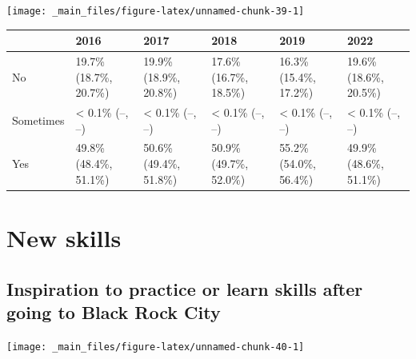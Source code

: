 \documentclass[
]{book}
\begin{document}
\texttt{[image: \_main\_files/figure-latex/unnamed-chunk-39-1]}

\begin{table}
\centering
\begin{tabular}[t]{>{}l|>{}l|>{}l|>{}l|>{}l|>{}l}
\hline
  & 2016 & 2017 & 2018 & 2019 & 2022\\
\hline
No & 19.7\% (18.7\%, 20.7\%) & 19.9\% (18.9\%, 20.8\%) & 17.6\% (16.7\%, 18.5\%) & 16.3\% (15.4\%, 17.2\%) & 19.6\% (18.6\%, 20.5\%)\\
\hline
Sometimes & < 0.1\% (--, --) & < 0.1\% (--, --) & < 0.1\% (--, --) & < 0.1\% (--, --) & < 0.1\% (--, --)\\
\hline
Yes & 49.8\% (48.4\%, 51.1\%) & 50.6\% (49.4\%, 51.8\%) & 50.9\% (49.7\%, 52.0\%) & 55.2\% (54.0\%, 56.4\%) & 49.9\% (48.6\%, 51.1\%)\\
\hline
\end{tabular}
\end{table}

\hypertarget{new-skills}{%
\section{New skills}\label{new-skills}}

\hypertarget{inspiration-to-practice-or-learn-skills-after-going-to-black-rock-city}{%
\subsection{Inspiration to practice or learn skills after going to Black Rock City}\label{inspiration-to-practice-or-learn-skills-after-going-to-black-rock-city}}

\texttt{[image: \_main\_files/figure-latex/unnamed-chunk-40-1]}
\end{document}
